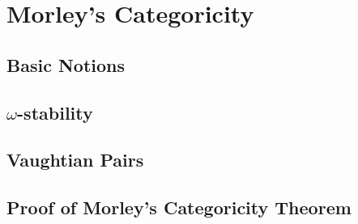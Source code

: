 \documentclass[10pt]{report}
\theoremstyle{definition}
\begin{document}






\chapter{Morley's Categoricity}

\section{Basic Notions}



\section{\(\omega\)-stability}


\section{Vaughtian Pairs}


\section{Proof of Morley's Categoricity Theorem}


%
\end{document}
